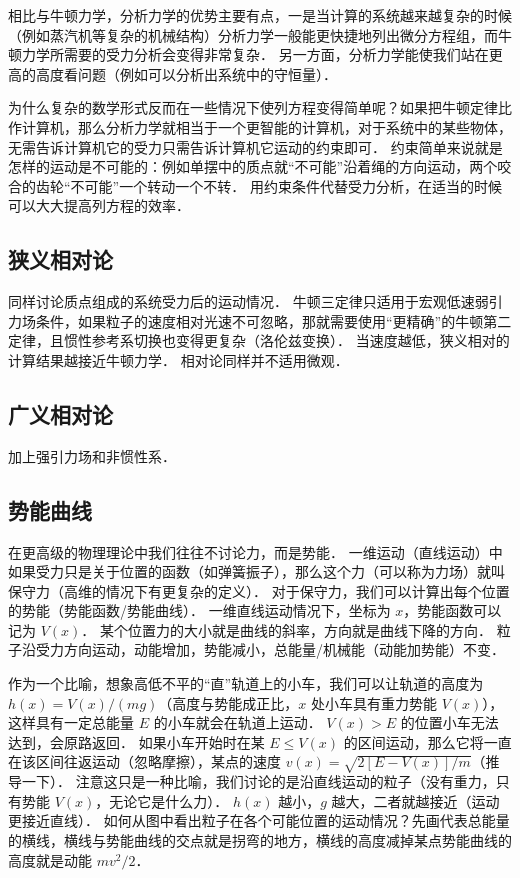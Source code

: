 相比与牛顿力学，分析力学的优势主要有点，一是当计算的系统越来越复杂的时候（例如蒸汽机等复杂的机械结构）分析力学一般能更快捷地列出微分方程组，而牛顿力学所需要的受力分析会变得非常复杂． 另一方面，分析力学能使我们站在更高的高度看问题（例如可以分析出系统中的守恒量）．

为什么复杂的数学形式反而在一些情况下使列方程变得简单呢？如果把牛顿定律比作计算机，那么分析力学就相当于一个更智能的计算机，对于系统中的某些物体，无需告诉计算机它的受力只需告诉计算机它运动的约束即可． 约束简单来说就是怎样的运动是不可能的：例如单摆中的质点就“不可能”沿着绳的方向运动，两个咬合的齿轮“不可能”一个转动一个不转． 用约束条件代替受力分析，在适当的时候可以大大提高列方程的效率．

\subsection{狭义相对论}
同样讨论质点组成的系统受力后的运动情况． 牛顿三定律只适用于宏观低速弱引力场条件，如果粒子的速度相对光速不可忽略，那就需要使用“更精确”的牛顿第二定律，且惯性参考系切换也变得更复杂（洛伦兹变换）． 当速度越低，狭义相对的计算结果越接近牛顿力学． 相对论同样并不适用微观．

\subsection{广义相对论}
加上强引力场和非惯性系．

\subsection{势能曲线}
在更高级的物理理论中我们往往不讨论力，而是势能． 一维运动（直线运动）中如果受力只是关于位置的函数（如弹簧振子），那么这个力（可以称为力场）就叫保守力（高维的情况下有更复杂的定义）． 对于保守力，我们可以计算出每个位置的势能（势能函数/势能曲线）． 一维直线运动情况下，坐标为 $x$，势能函数可以记为 $V(x)$． 某个位置力的大小就是曲线的斜率，方向就是曲线下降的方向． 粒子沿受力方向运动，动能增加，势能减小，总能量/机械能（动能加势能）不变．

作为一个比喻，想象高低不平的“直”轨道上的小车，我们可以让轨道的高度为 $h(x) = V(x)/(mg)$（高度与势能成正比，$x$ 处小车具有重力势能 $V(x)$），这样具有一定总能量 $E$ 的小车就会在轨道上运动． $V(x) > E$ 的位置小车无法达到，会原路返回． 如果小车开始时在某 $E \leq V(x)$ 的区间运动，那么它将一直在该区间往返运动（忽略摩擦），某点的速度 $v(x) = \sqrt{2[E - V(x)]/m}$（推导一下）． 注意这只是一种比喻，我们讨论的是沿直线运动的粒子（没有重力，只有势能 $V(x)$，无论它是什么力）． $h(x)$ 越小，$g$ 越大，二者就越接近（运动更接近直线）． 如何从图中看出粒子在各个可能位置的运动情况？先画代表总能量的横线，横线与势能曲线的交点就是拐弯的地方，横线的高度减掉某点势能曲线的高度就是动能 $mv^2/2$．

